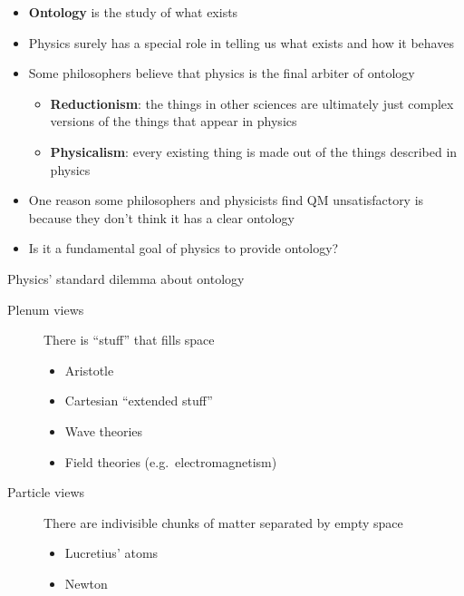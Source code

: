 \documentclass[fleqn]{beamer}
\newcommand{\kw}[1]{\textbf{#1}}
\begin{document}
\begin{frame}

  \begin{itemize}
  \item \kw{Ontology} is the study of what exists
  \item Physics surely has a special role in telling us what exists
    and how it behaves
  \item Some philosophers believe that physics is the final arbiter of
    ontology
    \begin{itemize}
    \item \kw{Reductionism}: the things in other sciences are
      ultimately just complex versions of the things that appear in
      physics
    \item \kw{Physicalism}: every existing thing is made out of the
      things described in physics
    \end{itemize}
  \end{itemize}

\end{frame}

\begin{frame}

  \begin{itemize}
  \item One reason some philosophers and physicists find QM
    unsatisfactory is because they don't think it has a clear ontology
  \item Is it a fundamental goal of physics to provide ontology?
  \end{itemize}

\end{frame}

\begin{frame}{Physics' standard dilemma about ontology}

  \begin{description}
  \item[Plenum views] There is ``stuff'' that fills space
    \begin{itemize}
    \item Aristotle
    \item Cartesian ``extended stuff''
    \item Wave theories
    \item Field theories (e.g.\ electromagnetism)
    \end{itemize}
  \item[Particle views] There are indivisible chunks of matter
    separated by empty space
    \begin{itemize}
    \item Lucretius' atoms
    \item Newton
    \end{itemize}
  \end{description}

\end{frame}
\end{document}
